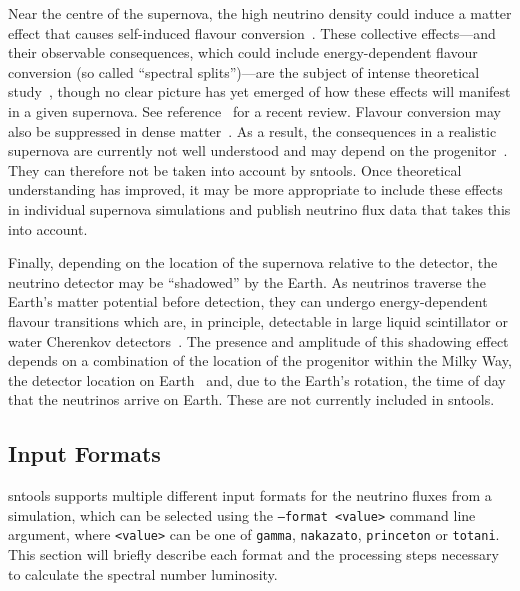 \documentclass[11pt, oneside]{article}
\begin{document}
Near the centre of the supernova, the high neutrino density could induce a matter effect that causes self-induced flavour conversion~\cite{Duan2006a,Duan2006}.
These collective effects---and their observable consequences, which could include energy-dependent flavour conversion (so called “spectral splits”)---are the subject of intense theoretical study~\cite{Raffelt2007,Dasgupta2009,Friedland2010,Duan2011,Izaguirre2017}, though no clear picture has yet emerged of how these effects will manifest in a given supernova.
See reference~\cite{Chakraborty2016} for a recent review.
Flavour conversion may also be suppressed in dense matter~\cite{Esteban-Pretel2008,Zaizen2018}.
As a result, the consequences in a realistic supernova are currently not well understood and may depend on the progenitor~\cite{Chakraborty2014}.
They can therefore not be taken into account by sntools.
Once theoretical understanding has improved, it may be more appropriate to include these effects in individual supernova simulations and publish neutrino flux data that takes this into account.

Finally, depending on the location of the supernova relative to the detector, the neutrino detector may be “shadowed” by the Earth.
As neutrinos traverse the Earth’s matter potential before detection, they can undergo energy-dependent flavour transitions which are, in principle, detectable in large liquid scintillator or water Cherenkov detectors~\cite{Dighe2003}.
The presence and amplitude of this shadowing effect depends on a combination of the location of the progenitor within the Milky Way, the detector location on Earth~\cite{Mirizzi2006} and, due to the Earth’s rotation, the time of day that the neutrinos arrive on Earth.
These are not currently included in sntools.%


\subsection{Input Formats} \label{sec:input-formats}
sntools supports multiple different input formats for the neutrino fluxes from a simulation, which can be selected using the \texttt{--format <value>} command line argument, where \texttt{<value>} can be one of \texttt{gamma}, \texttt{nakazato}, \texttt{princeton} or \texttt{totani}.
This section will briefly describe each format and the processing steps necessary to calculate the spectral number luminosity.
\end{document}
